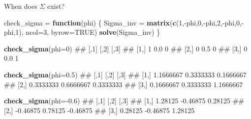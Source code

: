 \documentclass[11pt,ignorenonframetext,]{beamer}
\newenvironment{Shaded}{}{}
\newcommand{\ControlFlowTok}[1]{\textcolor[rgb]{0.00,0.44,0.13}{\textbf{#1}}}
\newcommand{\DataTypeTok}[1]{\textcolor[rgb]{0.56,0.13,0.00}{#1}}
\newcommand{\DecValTok}[1]{\textcolor[rgb]{0.25,0.63,0.44}{#1}}
\newcommand{\FloatTok}[1]{\textcolor[rgb]{0.25,0.63,0.44}{#1}}
\newcommand{\KeywordTok}[1]{\textcolor[rgb]{0.00,0.44,0.13}{\textbf{#1}}}
\newcommand{\NormalTok}[1]{#1}
\newcommand{\OperatorTok}[1]{\textcolor[rgb]{0.40,0.40,0.40}{#1}}
\newcommand{\OtherTok}[1]{\textcolor[rgb]{0.00,0.44,0.13}{#1}}
\newcommand{\StringTok}[1]{\textcolor[rgb]{0.25,0.44,0.63}{#1}}
\let\oldShaded\Shaded
\let\endoldShaded\endShaded
\renewenvironment{Shaded}{\footnotesize\begin{spacing}{0.9}\oldShaded}{\endoldShaded\end{spacing}}
\begin{document}
\begin{frame}[fragile,t]{When does \(\Sigma\) exist?}
\protect\hypertarget{when-does-sigma-exist}{}

\begin{Shaded}
\begin{Highlighting}[]
\NormalTok{check_sigma =}\StringTok{ }\ControlFlowTok{function}\NormalTok{(phi) \{}
\NormalTok{  Sigma_inv =}\StringTok{ }\KeywordTok{matrix}\NormalTok{(}\KeywordTok{c}\NormalTok{(}\DecValTok{1}\NormalTok{,}\OperatorTok{-}\NormalTok{phi,}\DecValTok{0}\NormalTok{,}\OperatorTok{-}\NormalTok{phi,}\DecValTok{2}\NormalTok{,}\OperatorTok{-}\NormalTok{phi,}\DecValTok{0}\NormalTok{,}\OperatorTok{-}\NormalTok{phi,}\DecValTok{1}\NormalTok{), }\DataTypeTok{ncol=}\DecValTok{3}\NormalTok{, }\DataTypeTok{byrow=}\OtherTok{TRUE}\NormalTok{) }
  \KeywordTok{solve}\NormalTok{(Sigma_inv)}
\NormalTok{\}}

\KeywordTok{check_sigma}\NormalTok{(}\DataTypeTok{phi=}\DecValTok{0}\NormalTok{)}
\NormalTok{##      [,1] [,2] [,3]}
\NormalTok{## [1,]    1  0.0    0}
\NormalTok{## [2,]    0  0.5    0}
\NormalTok{## [3,]    0  0.0    1}

\KeywordTok{check_sigma}\NormalTok{(}\DataTypeTok{phi=}\FloatTok{0.5}\NormalTok{)}
\NormalTok{##           [,1]      [,2]      [,3]}
\NormalTok{## [1,] 1.1666667 0.3333333 0.1666667}
\NormalTok{## [2,] 0.3333333 0.6666667 0.3333333}
\NormalTok{## [3,] 0.1666667 0.3333333 1.1666667}

\KeywordTok{check_sigma}\NormalTok{(}\DataTypeTok{phi=}\OperatorTok{-}\FloatTok{0.6}\NormalTok{)}
\NormalTok{##          [,1]     [,2]     [,3]}
\NormalTok{## [1,]  1.28125 -0.46875  0.28125}
\NormalTok{## [2,] -0.46875  0.78125 -0.46875}
\NormalTok{## [3,]  0.28125 -0.46875  1.28125}
\end{Highlighting}
\end{Shaded}

\end{frame}
\end{document}
